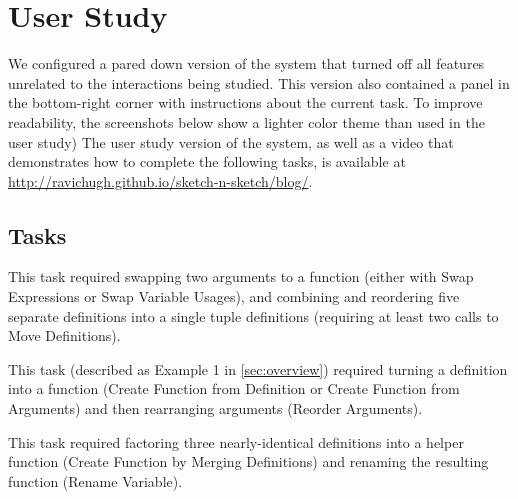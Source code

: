 \section{User Study}
\label{sec:appendix-user-study}

We configured a pared down version of the system that turned off all \sns{}
features unrelated to the interactions being studied. This version also
contained a panel in the bottom-right corner with instructions about the current
task. To improve readability, the screenshots below show a lighter color theme
than used in the user study)
%
The user study version of the system, as well as a video that
demonstrates how to complete the following tasks, is available
at \url{http://ravichugh.github.io/sketch-n-sketch/blog/}.

\subsection{Tasks}

\newcommand{\taskScreenshotScale}{0.33}


This task required swapping two arguments to a function (either with
Swap Expressions or Swap Variable Usages), and combining and reordering
five separate definitions into a single tuple definitions (requiring at least
two calls to Move Definitions).

\begin{figure}[h]
\end{figure}


This task (described as Example 1 in \autoref{sec:overview}) required turning
a definition into a function (Create Function from Definition or Create Function
from Arguments) and then rearranging arguments (Reorder Arguments).

\begin{figure}[h]
\end{figure}

\clearpage


This task required factoring three nearly-identical definitions into a helper
function (Create Function by Merging Definitions) and renaming the resulting
function (Rename Variable).

